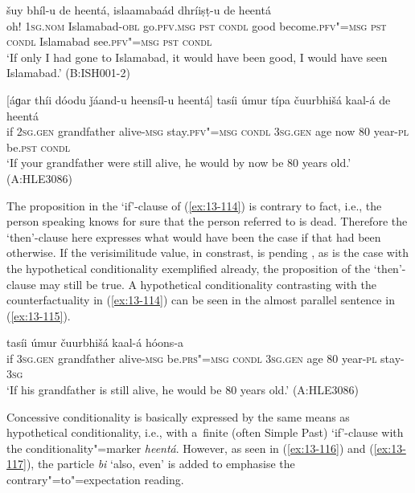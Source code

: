 \begin{exe}
\ex
\label{ex:13-113}
 šuy bhíl-u de heentá,
islaamabaád  dhríiṣṭ-u de heentá \\
oh! \textsc{1sg.nom} Islamabad-\textsc{obl} go.\textsc{pfv.msg} \textsc{pst}  \textsc{condl} good become.\textsc{pfv"=msg} \textsc{pst} \textsc{condl} Islamabad see.\textsc{pfv"=msg} \textsc{pst} \textsc{condl} \\
\glt `If only I had gone to Islamabad, it would have been good, I would have seen Islamabad.' (B:ISH001-2)

\ex
\label{ex:13-114}
\gll \label{bkm:Ref190830564}[áɡar thíi dóodu ǰáand-u heensíl-u  heentá]
tasíi úmur típa čuurbhišá kaal-á de  heentá \\
if \textsc{2sg.gen} grandfather alive-\textsc{msg} stay.\textsc{pfv"=msg}  \textsc{condl} 
\textsc{3sg.gen} age now 80 year-\textsc{pl} be.\textsc{pst} \textsc{condl} \\
\glt `If your grandfather were still alive, he would by now be 80 years old.' (A:HLE3086) 
\end{exe}

The proposition in the `if'-clause of (\ref{ex:13-114}) is contrary to fact, i.e., the person speaking knows for sure that the person referred to is dead. Therefore the `then'-clause here expresses what would have been the case if that had been otherwise. If the verisimilitude value, in constrast, is pending \citep[332]{givon2001b}, as is the case with the hypothetical conditionality exemplified already, the proposition of the `then'-clause may still be true. A hypothetical conditionality contrasting with the counterfactuality in (\ref{ex:13-114}) can be seen in the almost parallel sentence in (\ref{ex:13-115}).

\begin{exe}
\ex
\label{ex:13-115}
 tasíi úmur čuurbhišá kaal-á hóons-a \\
if \textsc{3sg.gen} grandfather alive-\textsc{msg} be.\textsc{prs"=msg}  \textsc{condl} \textsc{3sg.gen} age 80 year-\textsc{pl} stay-\textsc{3sg} \\
\glt `If his grandfather is still alive, he would be 80 years old.' (A:HLE3086) 
\end{exe}

 Concessive conditionality is basically expressed by the same means as hypothetical conditionality, i.e., with a~finite (often Simple Past) `if'-clause with the conditionality"=marker \textit{heentá}. However, as seen in (\ref{ex:13-116}) and (\ref{ex:13-117}), the particle \textit{bi} `also, even' is added to emphasise the contrary"=to"=expectation reading. 


